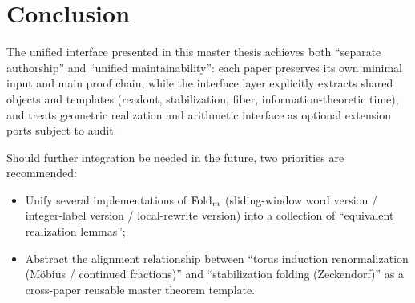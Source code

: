 \section{Conclusion}

The unified interface presented in this master thesis achieves both ``separate authorship'' and ``unified maintainability'': each paper preserves its own minimal input and main proof chain, while the interface layer explicitly extracts shared objects and templates (readout, stabilization, fiber, information-theoretic time), and treats geometric realization and arithmetic interface as optional extension ports subject to audit.

Should further integration be needed in the future, two priorities are recommended:
\begin{itemize}
  \item Unify several implementations of $\mathrm{Fold}_m$ (sliding-window word version / integer-label version / local-rewrite version) into a collection of ``equivalent realization lemmas'';
  \item Abstract the alignment relationship between ``torus induction renormalization (Möbius / continued fractions)'' and ``stabilization folding (Zeckendorf)'' as a cross-paper reusable master theorem template.
\end{itemize}

